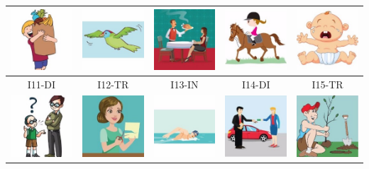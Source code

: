 \documentclass[12pt,notitlepage]{article}
\begin{document}
\begin{center}
\begin{tabular}{|c||c||c||c||c|}
\includegraphics[width=0.13\columnwidth]{square/I06.jpg} &  \includegraphics[width=0.13\columnwidth]{square/I07.jpg} &  \includegraphics[width=0.13\columnwidth]{square/I08.jpg} & \includegraphics[width=0.13\columnwidth]{square/I09.jpg} & \includegraphics[width=0.13\columnwidth]{square/I10.jpg} \\
\hline
\hline
I11-DI & I12-TR & I13-IN & I14-DI & I15-TR \\
\includegraphics[width=0.13\columnwidth]{square/I11.jpg} &  \includegraphics[width=0.13\columnwidth]{square/I12.jpg} & \includegraphics[width=0.13\columnwidth]{square/I13.jpg} & \includegraphics[width=0.13\columnwidth]{square/I14.jpg} &  \includegraphics[width=0.13\columnwidth]{square/I15.jpg} \\

\end{tabular}
\end{center}
\end{document}
